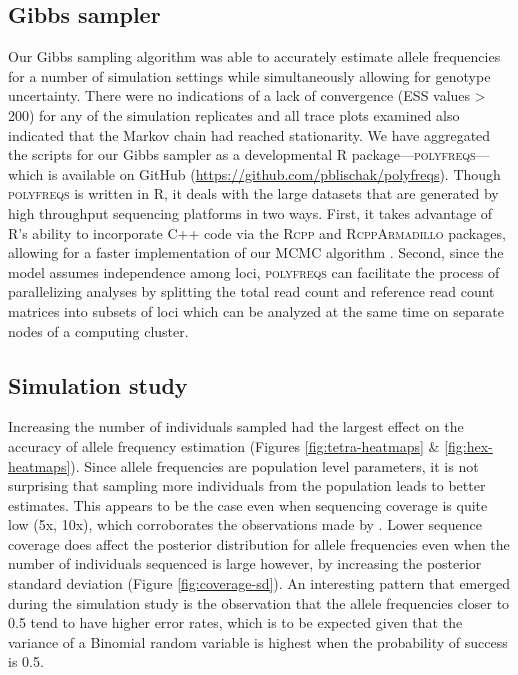 \documentclass[11pt,english,letterpaper,oneside]{article}
\begin{document}
\subsection*{Gibbs sampler}
\medskip

Our Gibbs sampling algorithm was able to accurately estimate allele frequencies for a number of simulation settings while simultaneously allowing for genotype uncertainty. There were no indications of a lack of convergence (ESS values > 200) for any of the simulation replicates and all trace plots examined also indicated that the Markov chain had reached stationarity. We have aggregated the scripts for our Gibbs sampler as a developmental R package---\textsc{polyfreqs}---which is available on GitHub (\url{https://github.com/pblischak/polyfreqs}). Though \textsc{polyfreqs} is written in R, it deals with the large datasets that are generated by high throughput sequencing platforms in two ways. First, it takes advantage of R's ability to incorporate C++ code via the \textsc{Rcpp} and \textsc{RcppArmadillo} packages, allowing for a faster implementation of our MCMC algorithm \citep{eddelbuettel2011rcpp,eddelbuettel2013rcppBook,eddelbuettel2014rcpparmadillo}. Second, since the model assumes independence among loci, \textsc{polyfreqs} can facilitate the process of parallelizing analyses by splitting the total read count and reference read count matrices into subsets of loci which can be analyzed at the same time on separate nodes of a computing cluster.

\medskip
\subsection*{Simulation study}
\medskip

Increasing the number of individuals sampled had the largest effect on the accuracy of allele frequency estimation (Figures \ref{fig:tetra-heatmaps} \& \ref{fig:hex-heatmaps}). Since allele frequencies are population level parameters, it is not surprising that sampling more individuals from the population leads to better estimates. This appears to be the case even when sequencing coverage is quite low (5x, 10x), which corroborates the observations made by \cite{buerkle2013popModels}. Lower sequence coverage does affect the posterior distribution for allele frequencies even when the number of individuals sequenced is large however, by increasing the posterior standard deviation (Figure \ref{fig:coverage-sd}). An interesting pattern that emerged during the simulation study is the observation that the allele frequencies closer to 0.5 tend to have higher error rates, which is to be expected given that the variance of a Binomial random variable is highest when the probability of success is 0.5.
\medskip
\end{document}
